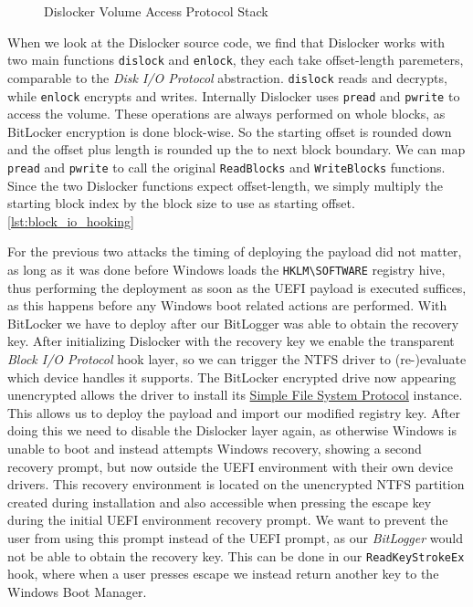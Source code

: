 \begin{figure}[htb]%
    \centering
    
    \caption{Dislocker Volume Access Protocol Stack}%
    \label{fig:dislocker-volume-access-protocol-stack}%
\end{figure}

When we look at the Dislocker source code, we find that Dislocker works with two main functions \lstinline{dislock} and \lstinline{enlock}, they each take offset-length paremeters, comparable to the \emph{Disk \ac{I/O} Protocol} abstraction.
\lstinline{dislock} reads and decrypts, while \lstinline{enlock} encrypts and writes.
Internally Dislocker uses \lstinline{pread} and \lstinline{pwrite} to access the volume.
These operations are always performed on whole blocks, as BitLocker encryption is done block-wise.
So the starting offset is rounded down and the offset plus length is rounded up the to next block boundary.
We can map \lstinline{pread} and \lstinline{pwrite} to call the original \lstinline{ReadBlocks} and \lstinline{WriteBlocks} functions.
Since the two Dislocker functions expect offset-length, we simply multiply the starting block index by the block size to use as starting offset.
\autoref{lst:block_io_hooking}




For the previous two attacks the timing of deploying the payload did not matter, as long as it was done before Windows loads the \lstinline{HKLM\SOFTWARE} registry hive, thus performing the deployment as soon as the \ac{UEFI} payload is executed suffices, as this happens before any Windows boot related actions are performed.
With BitLocker we have to deploy after our BitLogger was able to obtain the recovery key.
After initializing Dislocker with the recovery key we enable the transparent \emph{Block \ac{I/O} Protocol} hook layer, so we can trigger the \ac{NTFS} driver to (re-)evaluate which device handles it supports.
The BitLocker encrypted drive now appearing unencrypted allows the driver to install its \hyperref[lst:simple-file-system-protocol]{Simple File System Protocol} instance.
This allows us to deploy the payload and import our modified registry key.
After doing this we need to disable the Dislocker layer again, as otherwise Windows is unable to boot and instead attempts Windows recovery, showing a second recovery prompt, but now outside the \ac{UEFI} environment with their own device drivers.
This recovery environment is located on the unencrypted \ac{NTFS} partition created during installation and also accessible when pressing the escape key during the initial \ac{UEFI} environment recovery prompt.
We want to prevent the user from using this prompt instead of the \ac{UEFI} prompt, as our \emph{BitLogger} would not be able to obtain the recovery key.
This can be done in our \lstinline{ReadKeyStrokeEx} hook, where when a user presses escape we instead return another key to the Windows Boot Manager.

